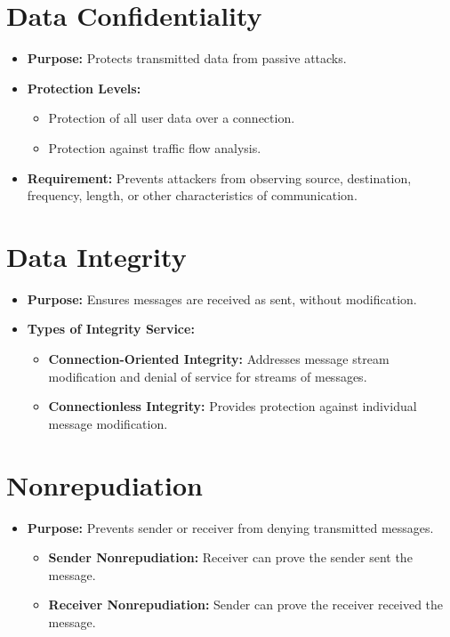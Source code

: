 \section{Data Confidentiality}
\begin{itemize}
    \item \textbf{Purpose:} Protects transmitted data from passive attacks.
    \item \textbf{Protection Levels:}
    \begin{itemize}
        \item Protection of all user data over a connection.
        \item Protection against traffic flow analysis.
    \end{itemize}
    \item \textbf{Requirement:} Prevents attackers from observing source, destination, frequency, length, or other characteristics of communication.
\end{itemize}

\section{Data Integrity}
\begin{itemize}
    \item \textbf{Purpose:} Ensures messages are received as sent, without modification.
    \item \textbf{Types of Integrity Service:}
    \begin{itemize}
        \item \textbf{Connection-Oriented Integrity:} Addresses message stream modification and denial of service for streams of messages.
        \item \textbf{Connectionless Integrity:} Provides protection against individual message modification.
    \end{itemize}
\end{itemize}

\section{Nonrepudiation}
\begin{itemize}
    \item \textbf{Purpose:} Prevents sender or receiver from denying transmitted messages.
    \begin{itemize}
        \item \textbf{Sender Nonrepudiation:} Receiver can prove the sender sent the message.
        \item \textbf{Receiver Nonrepudiation:} Sender can prove the receiver received the message.
    \end{itemize}
\end{itemize}


